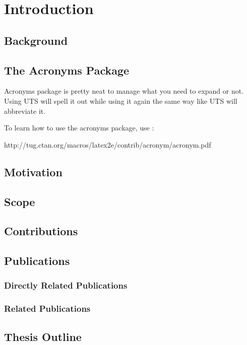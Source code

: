 %
\chapter{Introduction}
\label{Chapter1}

\lipsum[3-10]


\section{Background}
\label{Chapter1:Background}

\section{The Acronyms Package}

Acronyms package is pretty neat to manage what you need to expand or not. Using \ac{UTS} will spell it out while using it again the same way like \ac{UTS} will abbreviate it.

To learn how to use the acronyms package, use :

http://tug.ctan.org/macros/latex2e/contrib/acronym/acronym.pdf

\section{Motivation}
\label{Chapter1:Motivation}


\section{Scope}
\label{Chapter1:Scope}


\section{Contributions}
\label{Chapter1:Contributions}


\section{Publications}
\label{Chapter1:Publications}

\subsection{Directly Related Publications}

\subsection{Related Publications}


\section{Thesis Outline}
\label{Chapter1:ThesisOutline}



